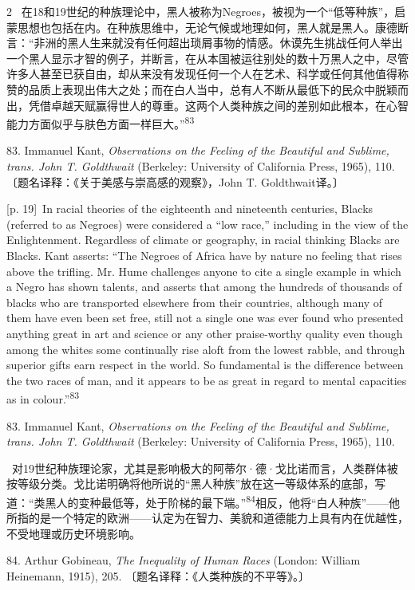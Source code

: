 \documentclass[10pt,a4paper]{article}
\begin{document}
\begin{paracol}{2}
\switchcolumn*
{\scriptsize\color{gray} [p. 19]}\ 在18和19世纪的种族理论中，黑人被称为Negroes，被视为一个“低等种族”，启蒙思想也包括在内。在种族思维中，无论气候或地理如何，黑人就是黑人。康德断言：“非洲的黑人生来就没有任何超出琐屑事物的情感。休谟先生挑战任何人举出一个黑人显示才智的例子，并断言，在从本国被运往别处的数十万黑人之中，尽管许多人甚至已获自由，却从来没有发现任何一个人在艺术、科学或任何其他值得称赞的品质上表现出伟大之处；而在白人当中，总有人不断从最低下的民众中脱颖而出，凭借卓越天赋赢得世人的尊重。这两个人类种族之间的差别如此根本，在心智能力方面似乎与肤色方面一样巨大。”\nobreak\textsuperscript{83}\par{\small 83. Immanuel Kant, \textit{Observations on the Feeling of the Beautiful and Sublime, trans. John T. Goldthwait} (Berkeley: University of California Press, 1965), 110. 〔题名译释：《关于美感与崇高感的观察》，John T. Goldthwait译。〕\par}
\switchcolumn
{\scriptsize\color{gray} [p. 19]}\ In racial theories of the eighteenth and nineteenth centuries, Blacks (referred to as Negroes) were considered a “low race,” including in the view of the Enlightenment. Regardless of climate or geography, in racial thinking Blacks are Blacks. Kant asserts: “The Negroes of Africa have by nature no feeling that rises above the trifling. Mr. Hume challenges anyone to cite a single example in which a Negro has shown talents, and asserts that among the hundreds of thousands of blacks who are transported elsewhere from their countries, although many of them have even been set free, still not a single one was ever found who presented anything great in art and science or any other praise-worthy quality even though among the whites some continually rise aloft from the lowest rabble, and through superior gifts earn respect in the world. So fundamental is the difference between the two races of man, and it appears to be as great in regard to mental capacities as in colour.”\nobreak\textsuperscript{83}\par{\small 83. Immanuel Kant, \textit{Observations on the Feeling of the Beautiful and Sublime, trans. John T. Goldthwait} (Berkeley: University of California Press, 1965), 110.\par}
\switchcolumn*
{\scriptsize\color{gray} [p. 19]}\ 对19世纪种族理论家，尤其是影响极大的阿蒂尔·德·戈比诺而言，人类群体被按等级分类。戈比诺明确将他所说的“黑人种族”放在这一等级体系的底部，写道：“类黑人的变种最低等，处于阶梯的最下端。”\nobreak\textsuperscript{84}相反，他将“白人种族”——他所指的是一个特定的欧洲——认定为在智力、美貌和道德能力上具有内在优越性，不受地理或历史环境影响。\par{\small 84. Arthur Gobineau, \textit{The Inequality of Human Races} (London: William Heinemann, 1915), 205. 〔题名译释：《人类种族的不平等》。〕\par}

\end{paracol}
\end{document}
